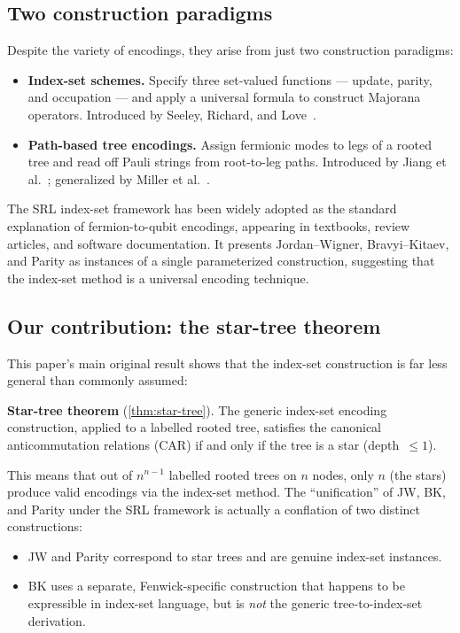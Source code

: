 \subsection{Two construction paradigms}

Despite the variety of encodings, they arise from just two
construction paradigms:

\begin{itemize}
  \item \textbf{Index-set schemes.} Specify three set-valued functions ---
    update, parity, and occupation --- and apply a universal formula
    to construct Majorana operators.  Introduced by Seeley, Richard,
    and Love~\cite{seeley2012}.
  \item \textbf{Path-based tree encodings.} Assign fermionic modes to legs
    of a rooted tree and read off Pauli strings from root-to-leg
    paths.  Introduced by Jiang et al.~\cite{jiang2020};
    generalized by Miller et al.~\cite{miller2023bonsai}.
\end{itemize}

The SRL index-set framework has been widely adopted as the standard
explanation of fermion-to-qubit encodings, appearing in textbooks,
review articles, and software documentation.  It presents
Jordan--Wigner, Bravyi--Kitaev, and Parity as instances of a single
parameterized construction, suggesting that the index-set method is a
universal encoding technique.

\subsection{Our contribution: the star-tree theorem}

This paper's main original result shows that the index-set
construction is far less general than commonly assumed:

\begin{keyinsight}
\textbf{Star-tree theorem} (\cref{thm:star-tree}).
The generic index-set encoding construction, applied to a labelled
rooted tree, satisfies the canonical anticommutation relations (CAR)
if and only if the tree is a star (depth~$\le 1$).
\end{keyinsight}

This means that out of $n^{n-1}$ labelled rooted trees on $n$ nodes,
only $n$ (the stars) produce valid encodings via the index-set method.
The ``unification'' of JW, BK, and Parity under the SRL framework is
actually a conflation of two distinct constructions:
\begin{itemize}
  \item JW and Parity correspond to star trees and are genuine
    index-set instances.
  \item BK uses a separate, Fenwick-specific construction that
    happens to be expressible in index-set language, but is
    \emph{not} the generic tree-to-index-set derivation.
\end{itemize}

